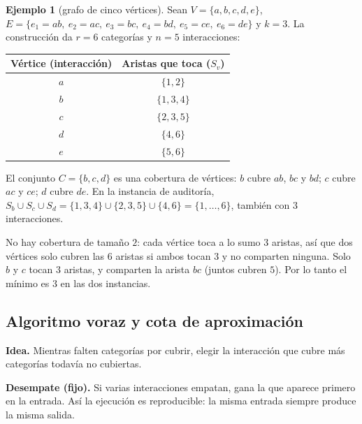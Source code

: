 \documentclass[11pt,a4paper]{article}
\theoremstyle{definition}
\newtheorem{ejemplo}[definicion]{Ejemplo}
\begin{document}
\begin{ejemplo}[grafo de cinco vértices]\label{ej:p2}
Sean $V=\{a,b,c,d,e\}$, $E=\{e_1{=}ab,\ e_2{=}ac,\ e_3{=}bc,\ e_4{=}bd,\ e_5{=}ce,\ e_6{=}de\}$ y $k=3$. La construcción da $r=6$ categorías y $n=5$ interacciones:
\begin{center}
\begin{tabular}{@{}cc@{}}
\toprule
Vértice (interacción) & Aristas que toca ($S_v$)\\
\midrule
$a$ & $\{1,2\}$\\
$b$ & $\{1,3,4\}$\\
$c$ & $\{2,3,5\}$\\
$d$ & $\{4,6\}$\\
$e$ & $\{5,6\}$\\
\bottomrule
\end{tabular}
\end{center}
El conjunto $C=\{b,c,d\}$ es una cobertura de vértices: $b$ cubre $ab$, $bc$ y $bd$; $c$ cubre $ac$ y $ce$; $d$ cubre $de$. En la instancia de auditoría, $S_b\cup S_c\cup S_d=\{1,3,4\}\cup\{2,3,5\}\cup\{4,6\}=\{1,\dots,6\}$, también con $3$ interacciones.

No hay cobertura de tamaño $2$: cada vértice toca a lo sumo $3$ aristas, así que dos vértices solo cubren las $6$ aristas si ambos tocan $3$ y no comparten ninguna. Solo $b$ y $c$ tocan $3$ aristas, y comparten la arista $bc$ (juntos cubren $5$). Por lo tanto el mínimo es $3$ en las dos instancias.
\end{ejemplo}

\subsection{Algoritmo voraz y cota de aproximación}

\textbf{Idea.} Mientras falten categorías por cubrir, elegir la interacción que cubre más categorías todavía no cubiertas.

\textbf{Desempate (fijo).} Si varias interacciones empatan, gana la que aparece primero en la entrada. Así la ejecución es reproducible: la misma entrada siempre produce la misma salida.
\end{document}
